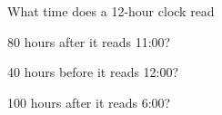 
%
%
%

	What time does a 12-hour clock read
	\begin{subproblem}
		\item 80 hours after it reads 11:00?
		\item 40 hours before it reads 12:00?
		\item 100 hours after it reads 6:00?
	\end{subproblem}

\solution
	\begin{subproblem}
		\item 
		\item 
		\item 
	\end{subproblem}

